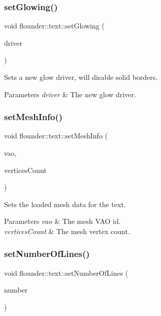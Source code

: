 \subsubsection{\texorpdfstring{set\+Glowing()}{setGlowing()}}
{\footnotesize\ttfamily void flounder\+::text\+::set\+Glowing (\begin{DoxyParamCaption}\item[{\hyperlink{classflounder_1_1idriver}{idriver} $\ast$}]{driver }\end{DoxyParamCaption})}



Sets a new glow driver, will disable solid borders. 


\begin{DoxyParams}{Parameters}
{\em driver} & The new glow driver. \\
\hline
\end{DoxyParams}
\mbox{\label{classflounder_1_1text_ac054e01c7cbe05522d3e778f23e951bd}} 
\subsubsection{\texorpdfstring{set\+Mesh\+Info()}{setMeshInfo()}}
{\footnotesize\ttfamily void flounder\+::text\+::set\+Mesh\+Info (\begin{DoxyParamCaption}\item[{const G\+Luint \&}]{vao,  }\item[{const G\+Luint \&}]{vertices\+Count }\end{DoxyParamCaption})}



Sets the loaded mesh data for the text. 


\begin{DoxyParams}{Parameters}
{\em vao} & The mesh V\+AO id. \\
\hline
{\em vertices\+Count} & The mesh vertex count. \\
\hline
\end{DoxyParams}
\mbox{\label{classflounder_1_1text_a5c4722b49473fb68783d921dd50fa329}} 
\subsubsection{\texorpdfstring{set\+Number\+Of\+Lines()}{setNumberOfLines()}}
{\footnotesize\ttfamily void flounder\+::text\+::set\+Number\+Of\+Lines (\begin{DoxyParamCaption}\item[{const int \&}]{number }\end{DoxyParamCaption})\hspace{0.3cm}{\ttfamily [inline]}}



